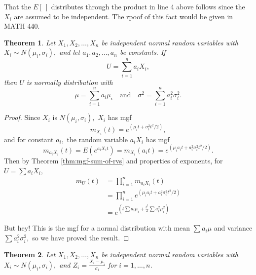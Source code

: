 \documentclass[
]{book}
\newtheorem{theorem}{Theorem}[chapter]
\theoremstyle{definition}
\theoremstyle{definition}
\theoremstyle{definition}
\theoremstyle{definition}
\theoremstyle{remark}
\begin{document}
That the \(E[~]\) distributes through the product in line 4 above follows since the \(X_i\) are assumed to be independent. The rpoof of this fact would be given in MATH 440.

\begin{theorem}
\protect\hypertarget{thm:sum-of-normal-rvs}{}\label{thm:sum-of-normal-rvs}Let \(X_1, X_2, \ldots, X_n\) be independent normal random variables with \(X_i \sim N(\mu_i, \sigma_i),\) and let \(a_1, a_2, \ldots, a_n\) be constants. If \[U = \sum_{i=1}^n a_i X_i,\] then \(U\) is normally distribution with \[\mu = \sum_{i=1}^n a_i \mu_i ~~~ \text{ and } ~~~ \sigma^2 = \sum_{i=1}^n a_i^2 \sigma_i^2.\]
\end{theorem}

\begin{proof}
Since \(X_i\) is \(N(\mu_i,\sigma_i),\) \(X_i\) has mgf \[m_{X_i}(t) = e^{\left(\mu_it + \sigma_i^2t^2/2\right)},\] and for constant \(a_i,\) the random variable \(a_iX_i\) has mgf \[m_{a_iX_i}(t) =E(e^{a_iX_it}) = m_{X_i}(a_it) = e^{\left(\mu_ia_it + a_i^2\sigma_i^2t^2/2\right)}.\]
Then by Theorem \ref{thm:mgf-sum-of-rvs} and properties of exponents, for \(U = \sum a_i X_i,\)
\begin{align*}
m_U(t) &= \prod_{i=1}^n m_{a_iX_i}(t) \\
      &= \prod_{i=1}^n e^{\left(\mu_ia_it + a_i^2\sigma_i^2t^2/2\right)}\\
      &= e^{\left(t\sum a_i\mu_i + \frac{t^2}{2}\sum a_i^2\mu_i^2\right)}
\end{align*}

But hey! This is the mgf for a normal distribution with mean \(\sum a_i \mu\) and variance \(\sum a_i^2 \sigma_i^2,\) so we have proved the result.
\end{proof}

\begin{theorem}
\protect\hypertarget{thm:sum-of-squares-of-standard-normal-rvs}{}\label{thm:sum-of-squares-of-standard-normal-rvs}Let \(X_1, X_2, \ldots, X_n\) be independent normal random variables with \(X_i \sim N(\mu_i, \sigma_i),\) and \(\displaystyle Z_i = \frac{X_i - \mu_i}{\sigma_i}\) for \(i = 1, \ldots, n\).
\end{theorem}
\end{document}
